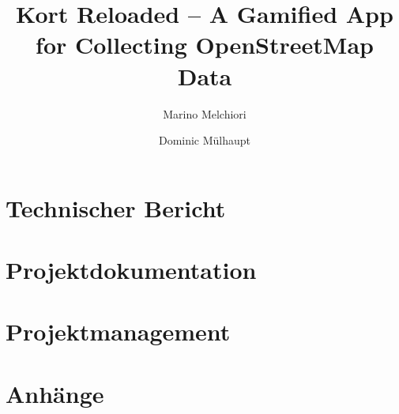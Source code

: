 



\title{Kort Reloaded – A Gamified App for Collecting OpenStreetMap Data}
\author{Marino Melchiori
		\and
		Dominic Mülhaupt}






%







\tableofcontents

\cleardoublepage


\part{Technischer Bericht}


\cleardoublepage

\part{Projektdokumentation}


\cleardoublepage

\part{Projektmanagement}

%
\cleardoublepage

\part{Anhänge}



\printglossary[style=altlist, title=Glossar, toctitle=Glossar]
\label{glossar}




\listoffigures

\listoftables

